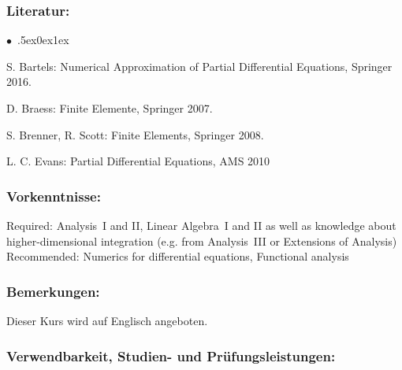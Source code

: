 \documentclass[a4paper,10pt]{article}
\renewenvironment{itemize}{\begin{list}{$\bullet$\ }{\itemsep.5ex\setlength{\topsep}{0.5\itemsep}\parsep0ex\labelsep1ex\settowidth{\labelwidth}{$\bullet$\ }\setlength{\leftmargin}{\labelwidth}\addtolength{\leftmargin}{3ex}\addtolength{\leftmargin}{\labelsep}}}{\end{list}}
\begin{document}
\subsubsection*{\large
    Literatur:
}
\begin{itemize}
\item  S. Bartels: Numerical Approximation of Partial Differential Equations, Springer 2016. 
\item  D. Braess: Finite Elemente, Springer 2007. 
\item  S. Brenner, R. Scott: Finite Elements, Springer 2008. 
\item  L. C. Evans: Partial Differential Equations, AMS 2010
\end{itemize}
\subsubsection*{\large
    Vorkenntnisse:
}
Required: Analysis~I and II, Linear Algebra~I and II as well as knowledge about higher-dimensional integration (e.g. from Analysis~III or Extensions of Analysis) \\
Recommended:  Numerics for differential equations, Functional analysis
\subsubsection*{\large
    Bemerkungen:
}
Dieser Kurs wird auf Englisch angeboten.
\cleardoublepage
\subsubsection*{\large
    Verwendbarkeit, Studien- und Prüfungsleistungen:
}
\end{document}
